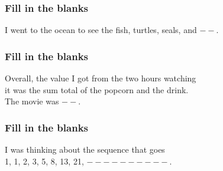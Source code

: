 

\begin{frame}[fragile]\frametitle{Fill in the blanks}

\begin{center}
I went to the ocean to see the fish, turtles, seals, and $--$.
\end{center}		  

\end{frame}

\begin{frame}[fragile]\frametitle{Fill in the blanks}

\begin{center}
Overall, the value I got from the two hours watching \\ it was the sum total of the popcorn and the drink.\\
The movie was  $--$.
\end{center}		  

\end{frame}




\begin{frame}[fragile]\frametitle{Fill in the blanks}

\begin{center}
I was thinking about the sequence that goes  \\ 1, 1, 2, 3, 5, 8, 13, 21,   $----------$.
\end{center}		  

\end{frame}

